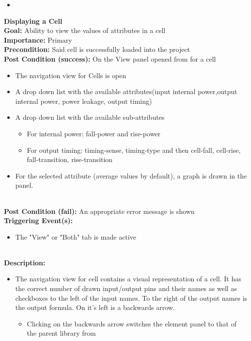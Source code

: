 \documentclass[10pt,a4paper]{report}
\newcommand{\precondition}[1]{
    \textbf{Precondition: } #1 \leavevmode \\
}
\newcommand{\FRDescription}[8]{
    \textbf{#1} \leavevmode \\
    \textbf{Goal: } #2 \leavevmode \\
    \textbf{Importance: } #3 \leavevmode \\
    \precondition{#4}
    \textbf{Post Condition (success): } #5 \leavevmode \\
    \textbf{Post Condition (fail): } #6 \leavevmode \\
    \textbf{Triggering Event(s): } #7 \leavevmode \\
    \textbf{Description: } \leavevmode \\ 
    #8}
\begin{document}
\begin{FR}
{\begin{itemize}
\begin{itemize}
                \begin{itemize}
                    \item In case a cell has 2 pins while another has 3, input state powers with 3 digits will be shown, but the power leakage will be taken by taking the last 2 digits into account
                \end{itemize}
        \end{itemize}
        \item 
    \end{itemize}}
    \item \FRDescription{Displaying a Cell}
    {Ability to view the values of attributes in a cell}
    {Primary}
    {Said cell is successfully loaded into the project}
    {On the View panel opened from \label{FR-PREVIOUS} for a cell
    \begin{itemize}
        \item The navigation view for Cells is open
        \item A drop down list with the available attributes(input internal power,output internal power, power leakage, output timing)
        \item A drop down list with the available sub-attributes
        \begin{itemize}
            \item For internal power: fall-power and rise-power
            \item For output timing: timing-sense, timing-type and then cell-fall, cell-rise, fall-transition, rise-transition
        \end{itemize}
        \item For the selected attribute (average values by default), a graph is drawn in the panel.
    \end{itemize}}
    {An appropriate error message is shown}
    {\begin{itemize}
        \item The "View" or "Both" tab is made active
    \end{itemize}}
    {\begin{itemize}
        \item The navigation view for cell contains a visual representation of a cell. It has the correct number of drawn input/output pins and their names as well as checkboxes to the left of the input names. To the right of the output names is the output formula. On it's left is a backwards arrow.
        \begin{itemize}
            \item Clicking on the backwards arrow switches the element panel to that of the parent library from \label{FR-BLABLABLA}

\end{itemize}
\end{itemize}}
\end{FR}
\end{document}

